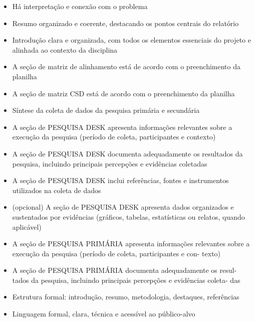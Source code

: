 \documentclass[
  sigconf,
  nonacm, %
  language=portuguese
]{acmart}
\begin{document}
\begin{itemize}[leftmargin=14pt,itemsep=1pt,topsep=3pt,parsep=0pt]
  \item[$\square$] {\small\textcolor{cmuted}{Há interpretação e conexão com o problema}}
  \item[$\square$] {\small\textcolor{cmuted}{Resumo organizado e coerente, destacando os pontos centrais do relatório}}
  \item[$\square$] {\small\textcolor{cmuted}{Introdução clara e organizada, com todos os elementos essenciais do projeto e alinhada ao contexto da disciplina}}
  \item[$\square$] {\small\textcolor{cmuted}{A seção de matriz de alinhamento está de acordo com o preenchimento da planilha}}
  \item[$\square$] {\small\textcolor{cmuted}{A seção de matriz CSD está de acordo com o preenchimento da planilha}}
  \item[$\square$] {\small\textcolor{cmuted}{Síntese da coleta de dados da pesquisa primária e secundária}}
  \item[$\square$] {\small\textcolor{cmuted}{A seção de PESQUISA DESK apresenta informações relevantes sobre a execução da pesquisa (período de coleta, participantes e contexto)}}
  \item[$\square$] {\small\textcolor{cmuted}{A seção de PESQUISA DESK documenta adequadamente os resultados da pesquisa, incluindo principais percepções e evidências coletadas}}
  \item[$\square$] {\small\textcolor{cmuted}{A seção de PESQUISA DESK inclui referências, fontes e instrumentos utilizados na coleta de dados}}
  \item[$\square$] {\small\textcolor{cmuted}{(opcional) A seção de PESQUISA DESK apresenta dados organizados e sustentados por evidências (gráficos, tabelas, estatísticas ou relatos, quando aplicável)}}
  \item[$\square$] {\small\textcolor{cmuted}{A seção de PESQUISA PRIMÁRIA apresenta informações relevantes  sobre a execução da pesquisa (período de coleta, participantes e con- texto)}}
  \item[$\square$] {\small\textcolor{cmuted}{A seção de PESQUISA PRIMÁRIA documenta adequadamente os resul- tados da pesquisa, incluindo principais percepções e evidências coleta- das}}
  \item[$\square$] {\small\textcolor{cmuted}{Estrutura formal: introdução, resumo, metodologia, destaques, referências}}
  \item[$\square$] {\small\textcolor{cmuted}{Linguagem formal, clara, técnica e acessível ao público-alvo}}

\end{itemize}
\end{document}
